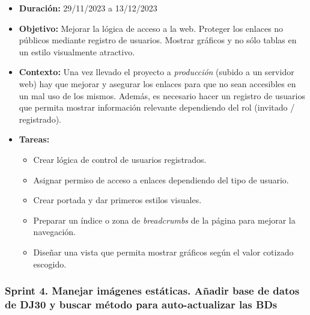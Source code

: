 \begin{itemize}
\item  
\textbf{Duración:} 29/11/2023 a 13/12/2023

\item
\textbf{Objetivo:} Mejorar la lógica de acceso a la web. Proteger los enlaces no públicos mediante registro de usuarios. Mostrar gráficos y no sólo tablas en un estilo visualmente atractivo. 

\item
\textbf{Contexto:} Una vez llevado el proyecto a \emph{producción} (subido a un servidor web) hay que mejorar y asegurar los enlaces para que no sean accesibles en un mal uso de los mismos. Además, es necesario hacer un registro de usuarios que permita mostrar información relevante dependiendo del rol (invitado / registrado). 

\item
\textbf{Tareas:}
	\begin{itemize}
	\tightlist
	\item 
	Crear lógica de control de usuarios registrados.
	\item 	
	Asignar permiso de acceso a enlaces dependiendo del tipo de usuario. 
	\item 
	Crear portada y dar primeros estilos visuales. 
  	\item 
  	Preparar un índice o zona de \emph{breadcrumbs} de la página para mejorar la navegación.
  	\item 
  	Diseñar una vista que permita mostrar gráficos según el valor cotizado escogido. 
  	\end{itemize}
\end{itemize}


\subsubsection{Sprint 4. Manejar imágenes estáticas. Añadir base de datos de DJ30 y buscar método para auto-actualizar las BDs}


